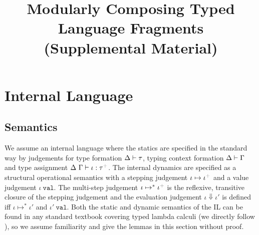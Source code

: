 \documentclass[12pt]{article}
\newcommand{\moutput}{^{\color{gray}+}}
\begin{document}

\title{Modularly Composing Typed Language Fragments (Supplemental Material)}

\author{ }


\trnumber{ }

\maketitle


\tableofcontents 
\listoffigures

\newpage



\section{Internal Language}
\subsection{Semantics}
We assume an internal language where the statics are specified in the standard way by judgements for  type formation {$\Delta \vdash \tau$}, typing context formation { $\Delta \vdash \Gamma$} and type assignment {$\iDelta~\iGamma \vdash \iota : \tau\moutput$}. 
The internal dynamics are specified as a structural operational semantics with a stepping judgement {\small $\iota \mapsto \iota\moutput$} and a value judgement {$\iota~\mathtt{val}$}. The multi-step judgement $\iota \mapsto^{*} \iota\moutput$ is the reflexive, transitive closure of the stepping judgement and the evaluation judgement $\iota \Downarrow \iota'$ is defined iff $\iota \mapsto^{*} \iota'$ and $\iota'~\mathtt{val}$. Both the static and dynamic semantics of the IL can be found in any standard textbook covering typed lambda calculi (we directly follow \cite{pfpl}), so we assume familiarity and give the lemmas in this section without proof.
\end{document}
